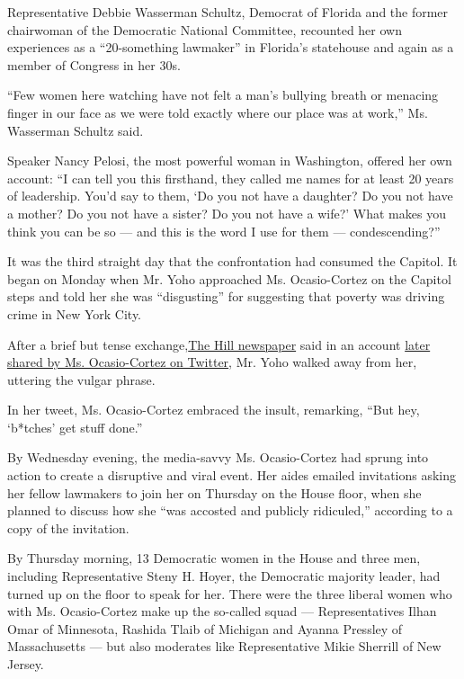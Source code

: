 Representative Debbie Wasserman Schultz, Democrat of Florida and the
former chairwoman of the Democratic National Committee, recounted her
own experiences as a ``20-something lawmaker'' in Florida's statehouse
and again as a member of Congress in her 30s.

``Few women here watching have not felt a man's bullying breath or
menacing finger in our face as we were told exactly where our place was
at work,'' Ms. Wasserman Schultz said.

Speaker Nancy Pelosi, the most powerful woman in Washington, offered her
own account: ``I can tell you this firsthand, they called me names for
at least 20 years of leadership. You'd say to them, `Do you not have a
daughter? Do you not have a mother? Do you not have a sister? Do you not
have a wife?' What makes you think you can be so --- and this is the
word I use for them --- condescending?''

It was the third straight day that the confrontation had consumed the
Capitol. It began on Monday when Mr. Yoho approached Ms. Ocasio-Cortez
on the Capitol steps and told her she was ``disgusting'' for suggesting
that poverty was driving crime in New York City.

After a brief but tense
exchange,\href{https://thehill.com/homenews/house/508259-ocaasio-cortez-accosted-by-gop-lawmaker-over-remarks-that-kind-of}{The
Hill newspaper} said in an account
\href{https://twitter.com/AOC/status/1285574615910227968?s=20}{later
shared by Ms. Ocasio-Cortez on Twitter}, Mr. Yoho walked away from her,
uttering the vulgar phrase.

In her tweet, Ms. Ocasio-Cortez embraced the insult, remarking, ``But
hey, `b*tches' get stuff done.''

By Wednesday evening, the media-savvy Ms. Ocasio-Cortez had sprung into
action to create a disruptive and viral event. Her aides emailed
invitations asking her fellow lawmakers to join her on Thursday on the
House floor, when she planned to discuss how she ``was accosted and
publicly ridiculed,'' according to a copy of the invitation.

By Thursday morning, 13 Democratic women in the House and three men,
including Representative Steny H. Hoyer, the Democratic majority leader,
had turned up on the floor to speak for her. There were the three
liberal women who with Ms. Ocasio-Cortez make up the so-called squad ---
Representatives Ilhan Omar of Minnesota, Rashida Tlaib of Michigan and
Ayanna Pressley of Massachusetts --- but also moderates like
Representative Mikie Sherrill of New Jersey.

